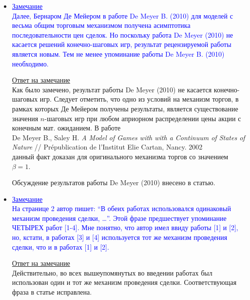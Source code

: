 \documentclass[12pt]{extarticle}
\begin{document}
\begin{itemize}
\item%
  \textcolor{blue}{%
    \underline{Замечание}\\
    Далее, Бернаром Де Мейером в работе De Meyer B. (2010) для моделей с весьма
    общим торговым механизмом получена асимптотика последовательности цен
    сделок. Но поскольку работа De Meyer (2010) не касается решений
    конечно-шаговых игр, результат рецензируемой работы является новым. Тем не
    менее упоминание работы De Meyer B. (2010) необходимо.}

  \underline{Ответ на замечание}\\
  Как было замечено, результат работы De Meyer (2010) не касается
  конечно-шаговых игр. Следует отметить, что одно из условий на механизм торгов,
  в рамках которых Де Мейером получены результаты, является существование
  значения $n$-шаговых игр при любом априорном распределении цены акции с
  конечным мат. ожиданием. В работе \\
  De Meyer B., Saley H. \textit{A Model of Games with with a Continuum of States
    of Nature} // Pr\'{e}publication de l'Institut Elie Cartan, Nancy. 2002 \\
  данный факт доказан для оригинального механизма торгов со значением $\beta =
  1$.

  Обсуждение результатов работы De Meyer (2010) внесено в статью.
  
\item%
  \textcolor{blue}{%
    \underline{Замечание}\\
    На странице 2 автор пишет: ``В обеих работах использовался одинаковый
    механизм проведения сделки, \dots''. Этой фразе предшествует упоминание
    ЧЕТЫРЕХ работ [1-4]. Мне понятно, что автор имел ввиду работы [1] и [2], но,
    кстати, в работах [3] и [4] используется тот же механизм проведения сделки,
    что и в работах [1] и [2].}

  \underline{Ответ на замечание}\\
  Действительно, во всех вышеупомянутых во введении работах был использован один
  и тот же механизм проведения сделки. Соответствующая фраза в статье
  исправлена.
\end{itemize}
\end{document}
